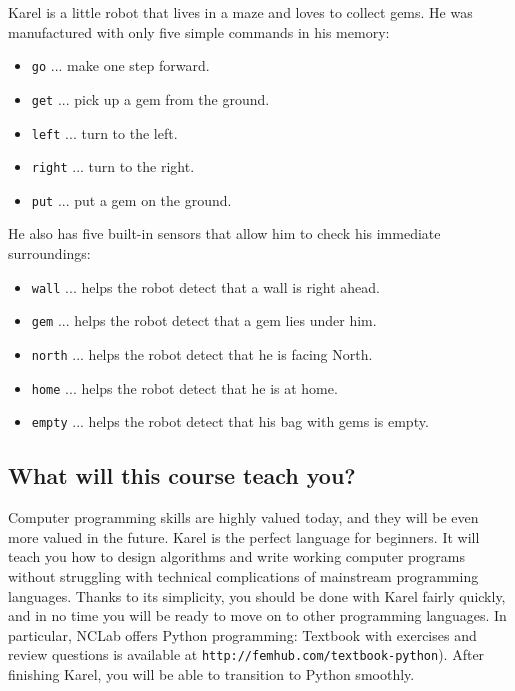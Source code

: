 Karel is a little robot that lives in a maze and loves to collect gems.
He was manufactured with only five simple commands in his memory:

\begin{itemize}
\item {\color{blue} \tt go} ... make one step forward.
\item {\color{blue} \tt get} ... pick up a gem from the ground. 
\item {\color{blue} \tt left} ... turn to the left.
\item {\color{blue} \tt right} ... turn to the right. 
\item {\color{blue} \tt put} ... put a gem on the ground. 
\end{itemize}
He also has five built-in sensors that allow him to check his immediate surroundings:
\begin{itemize}
\item {\color{ForestGreen} \tt wall} ... helps the robot detect that a wall is right ahead.
\item {\color{ForestGreen} \tt gem} ... helps the robot detect that a gem lies under him.
\item {\color{ForestGreen} \tt north} ... helps the robot detect that he is facing North.
\item {\color{ForestGreen} \tt home} ... helps the robot detect that he is at home.
\item {\color{ForestGreen} \tt empty} ... helps the robot detect that his bag with gems is empty.
\end{itemize}

\subsection{What will this course teach you?}

Computer programming skills are highly valued today, and they will be even more 
valued in the future. Karel is the perfect language for beginners. It will teach
you how to design algorithms and write working computer programs without struggling 
with technical complications of mainstream programming languages. Thanks to its 
simplicity, you should be done with Karel fairly quickly, and in no time you will be 
ready to move on to other programming languages. In particular, NCLab offers
Python programming: Textbook with exercises and review questions is available at 
{\tt http://femhub.com/textbook-python}). After finishing Karel, you will be able to 
transition to Python smoothly. 


